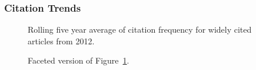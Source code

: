 \documentclass[
  10pt,
  letterpaper,
  DIV=11,
  numbers=noendperiod,
  twoside]{scrartcl}
\begin{document}
\subsubsection*{Citation Trends}\label{sec-trends-2012}

\begin{figure}


\caption{\label{fig-citation-spaghetti-2012}Rolling five year average of
citation frequency for widely cited articles from 2012.}

\end{figure}%

\begin{figure}


\caption{\label{fig-citation-facet-2012}Faceted version of
Figure~\ref{fig-citation-spaghetti-2012}.}

\end{figure}%
\end{document}
